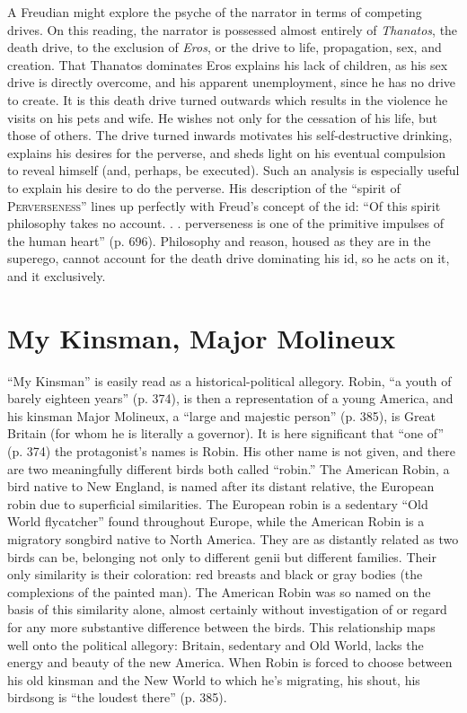 \documentclass[man,12pt,natbib]{apa6}
\begin{document}
A Freudian might explore the psyche of the narrator in terms of competing
drives.  On this reading, the narrator is possessed almost entirely of
\emph{Thanatos}, the death drive, to the exclusion of \emph{Eros}, or the drive
to life, propagation, sex, and creation. That Thanatos dominates Eros explains
his lack of children, as his sex drive is directly overcome, and his apparent
unemployment, since he has no drive to create. It is this death drive turned
outwards which results in the violence he visits on his pets and wife. He
wishes not only for the cessation of his life, but those of others. The drive
turned inwards motivates his self-destructive drinking, explains his desires
for the perverse, and sheds light on his eventual compulsion to reveal himself
(and, perhaps, be executed). Such an analysis is especially useful to explain
his desire to do the perverse. His description of the ``spirit of
P\textsc{erverseness}'' lines up perfectly with Freud's concept of the id: ``Of
this spirit philosophy takes no account. . .  perverseness is one of the
primitive impulses of the human heart'' (p. 696).  Philosophy and reason,
housed as they are in the superego, cannot account for the death drive
dominating his id, so he acts on it, and it exclusively.

\section{My Kinsman, Major Molineux}
\nocite{Hawthorne12a,Lesser55}

``My Kinsman'' is easily read as a historical-political allegory. Robin, ``a
youth of barely eighteen years'' (p. 374), is then a representation of a young
America, and his kinsman Major Molineux, a ``large and majestic person'' (p.
385), is Great Britain (for whom he is literally a governor). It is here
significant that ``one of'' (p. 374) the protagonist's names is Robin. His
other name is not given, and there are two meaningfully different birds both
called ``robin.'' The American Robin, a bird native to New England, is named
after its distant relative, the European robin due to superficial similarities.
The European robin is a sedentary ``Old World flycatcher'' found throughout
Europe, while the American Robin is a migratory songbird native to North
America.  They are as distantly related as two birds can be, belonging not only
to different genii but different families. Their only similarity is their
coloration: red breasts and black or gray bodies (the complexions of the
painted man). The American Robin was so named on the basis of this similarity
alone, almost certainly without investigation of or regard for any more
substantive difference between the birds.  This relationship maps well onto the
political allegory: Britain, sedentary and Old World, lacks the energy and
beauty of the new America. When Robin is forced to choose between his old
kinsman and the New World to which he's migrating, his shout, his birdsong is
``the loudest there'' (p. 385).
\end{document}
